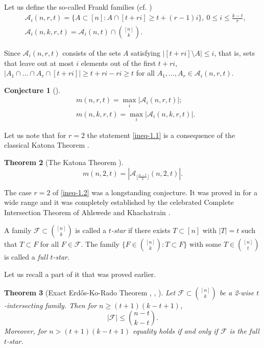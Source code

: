 \documentclass[11pt,a4paper]{article}
\newtheorem{thm}{Theorem}[section]
\newtheorem{false statement}{False statement}
\theoremstyle{definition}
\newtheorem{conj}[thm]{Conjecture}
\def\hf{\mathcal{F}}
\def\ha{\mathcal{A}}
\begin{document}
Let us define the so-called Frankl families (cf. \cite{F77PHD})
\begin{align*}
&\ha_i(n,r,t) =\{A\subset [n]\colon A\cap [t+r i]\geq t+(r-1)i\}, \ 0\leq i\leq \frac{k-t}{r},\\[3pt]
&\ha_i(n,k,r,t) =\ha_i(n,t) \cap \binom{[n]}{k}.
\end{align*}


Since $\ha_i(n,r,t)$ consists of the sets $A$ satisfying $|[t+ri]\setminus A|\leq i$, that is, sets that leave out at most $i$ elements out of the first $t+ri$, $|A_1\cap \ldots\cap A_r\cap [t+ri]|\geq t+ri-ri\geq t$ for all $A_1,\ldots,A_r\in \ha_i(n,r,t)$.

\begin{conj}[\cite{F77PHD}]
\begin{align}
&m(n,r,t) =\max_i|\ha_i(n,r,t)|;\label{ineq-1.1}\\[3pt]
&m(n,k,r,t) =\max_i |\ha_i(n,k,r,t)|.\label{ineq-1.2}
\end{align}
\end{conj}

Let us note that for $r=2$ the statement \eqref{ineq-1.1} is a consequence of the classical Katona Theorem \cite{K64}.

\begin{thm}[The Katona Theorem \cite{K64}]
\[
m(n,2,t) =|\ha_{\lfloor \frac{n-t}{2} \rfloor}(n,2,t)|.
\]
\end{thm}

The case $r=2$ of \eqref{ineq-1.2} was a longstanding conjecture. It was proved in \cite{FFu} for a wide range and it was completely established by the celebrated Complete Intersection Theorem of Ahlswede and Khachatrain \cite{AK}.

A family $\hf\subset \binom{[n]}{k}$ is called a {\it $t$-star} if there exists $T\subset [n]$ with $|T|=t$ such that $T\subset F$ for all $F\in \hf$. The family $\{F\in \binom{[n]}{k}\colon T\subset F\}$ with some $T\in \binom{[n]}{t}$ is called a {\it full $t$-star}.

Let us recall a part of it that was proved earlier.

\begin{thm}[Exact Erd\H{o}s-Ko-Rado Theorem \cite{ekr}, \cite{F78}, \cite{W84}]\label{thm-ekr}
Let $\hf\subset \binom{[n]}{k}$ be a 2-wise $t$-intersecting family. Then for $n\geq (t+1)(k-t+1)$,
\[
|\hf| \leq \binom{n-t}{k-t}.
\]
Moreover, for $n>(t+1)(k-t+1)$ equality holds if and only if $\hf$ is the full $t$-star.
\end{thm}
\end{document}
